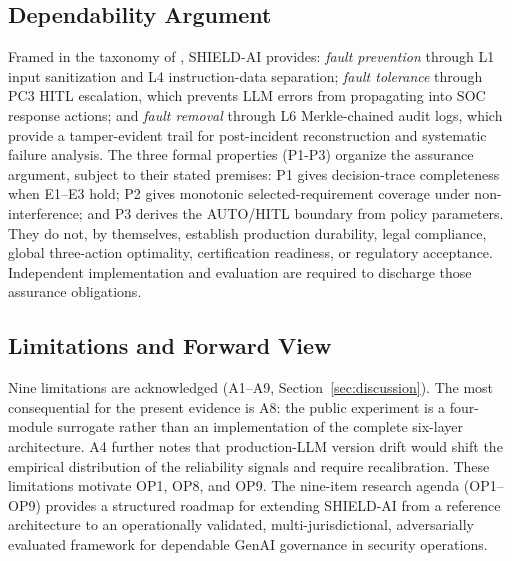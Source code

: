 \documentclass[journal]{IEEEtran}
\begin{document}
\subsection*{Dependability Argument}
Framed in the taxonomy of \cite{avizienis2004dependability}, SHIELD-AI provides:
\emph{fault prevention} through L1 input sanitization and L4 instruction-data separation;
\emph{fault tolerance} through PC3 HITL escalation, which prevents LLM errors from
propagating into SOC response actions; and \emph{fault removal} through L6 Merkle-chained
audit logs, which provide a tamper-evident trail for post-incident reconstruction and
systematic failure analysis. The three formal properties (P1-P3) organize the assurance
argument, subject to their stated premises: P1 gives decision-trace completeness when E1--E3
hold; P2 gives monotonic selected-requirement coverage under non-interference; and P3 derives
the AUTO/HITL boundary from policy parameters. They do not, by themselves, establish
production durability, legal compliance, global three-action optimality, certification
readiness, or regulatory acceptance. Independent implementation and evaluation are required
to discharge those assurance obligations.

\subsection*{Limitations and Forward View}
Nine limitations are acknowledged (A1--A9, Section~\ref{sec:discussion}). The most
consequential for the present evidence is A8: the public experiment is a four-module
surrogate rather than an implementation of the complete six-layer architecture. A4 further
notes that production-LLM version drift would shift the empirical distribution of the
reliability signals and require recalibration. These limitations motivate OP1, OP8, and OP9.
The nine-item research agenda (OP1--OP9)
provides a structured roadmap for extending SHIELD-AI from a reference architecture
to an operationally validated, multi-jurisdictional, adversarially evaluated framework
for dependable GenAI governance in security operations.

\end{document}
